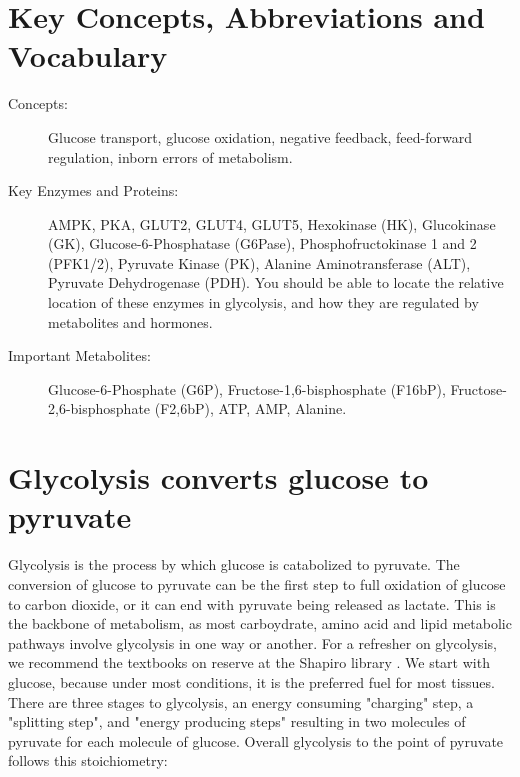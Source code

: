 \documentclass{tufte-handout}
\begin{document}
\section{Key Concepts, Abbreviations and Vocabulary}

\begin{description}
	\item[Concepts:] Glucose transport, glucose oxidation, negative feedback, feed-forward regulation, inborn errors of metabolism.  
	\item[Key Enzymes and Proteins:] AMPK, PKA, GLUT2, GLUT4, GLUT5, Hexokinase (HK), Glucokinase (GK), Glucose-6-Phosphatase (G6Pase), Phosphofructokinase 1 and 2 (PFK1/2), Pyruvate Kinase (PK), Alanine Aminotransferase (ALT), Pyruvate Dehydrogenase (PDH).  You should be able to locate the relative location of these enzymes in glycolysis, and how they are regulated by metabolites and hormones.
	\item[Important Metabolites:] Glucose-6-Phosphate (G6P), Fructose-1,6-bisphosphate (F16bP), Fructose-2,6-bisphosphate (F2,6bP), ATP, AMP, Alanine.

\end{description}

\pagebreak{}

\section{Glycolysis converts glucose to pyruvate}

Glycolysis is the process by which glucose is catabolized to pyruvate.  The conversion of glucose to pyruvate can be the first step to full oxidation of glucose to carbon dioxide, or it can end with pyruvate being released as lactate.  This is the backbone of metabolism, as most carboydrate, amino acid and lipid metabolic pathways involve glycolysis in one way or another.  For a refresher on glycolysis, we recommend the textbooks on reserve at the Shapiro library \citep{Berg2013,Ferrier2017}.  We start with glucose, because under most conditions, it is the preferred fuel for most tissues.  There are three stages to glycolysis, an energy consuming "charging" step, a "splitting step", and "energy producing steps" resulting in two molecules of pyruvate for each molecule of glucose.  Overall glycolysis to the point of pyruvate follows this stoichiometry:
\end{document}
